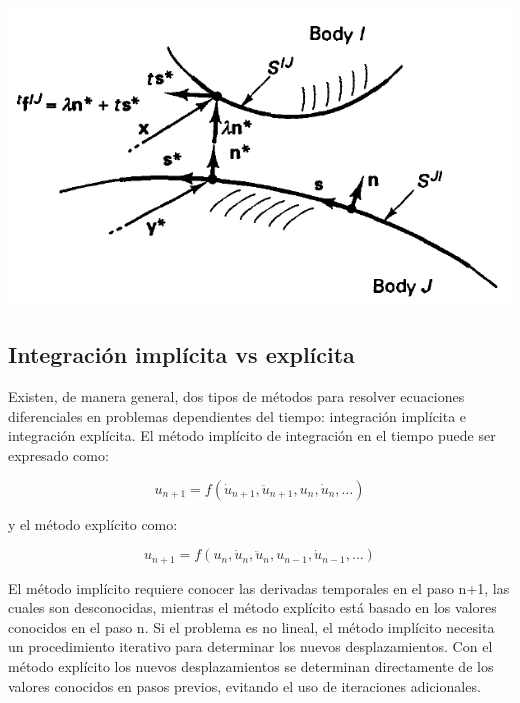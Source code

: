 \begin{center}
\includegraphics[scale=0.65]{src/ch2/contact_analysis.png}
\label{fig:contact_analysis}
\end{center}




\subsection{Integración implícita vs explícita}

Existen, de manera general, dos tipos de métodos para resolver ecuaciones diferenciales  
en problemas dependientes del tiempo: integración implícita e integración explícita. El 
método implícito de integración en el tiempo puede ser expresado como: ~\cite{nielsen1997}

\begin{equation}
u_{n+1}=f(\dot{u}_{n+1},\ddot{u}_{n+1},u_n,\dot{u}_n,…)
\end{equation}

y el método explícito como:

\begin{equation}
u_{n+1}=f(u_n,\dot{u}_n,\ddot{u}_n,u_{n-1},\dot{u}_{n-1},…)
\end{equation}

El método implícito requiere conocer las derivadas temporales en el paso n+1, las cuales son desconocidas, 
mientras el método explícito está basado en los valores conocidos en el paso n. Si el problema es no 
lineal, el método implícito necesita un procedimiento iterativo para determinar los nuevos desplazamientos. 
Con el método explícito los nuevos desplazamientos se determinan directamente de los valores conocidos 
en pasos previos, evitando el uso de iteraciones adicionales.~\cite{nielsen1997}\\

